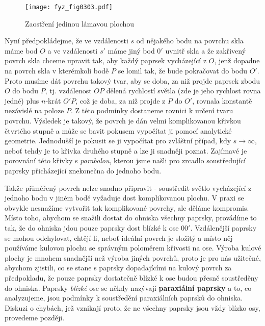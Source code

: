     \begin{figure}[ht!] %
      \centering
      \texttt{[image: fyz\_fig0303.pdf]}
      \caption{Zaostření jedinou lámavou plochou
               \cite[s.~358]{Feynman01}}
      \label{fyz:fig0303}  
    \end{figure}
    
    Nyní předpokládejme, že ve vzdálenosti \(s\) od nějakého bodu na povrchu skla máme bod \(O\) a 
    ve vzdálenosti \(s'\) máme jiný bod \(0'\) uvnitř skla a že zakřivený povrch skla chceme 
    upravit tak, aby každý paprsek vycházející z \(O\), jenž dopadne na povrch skla v kterémkoli 
    bodě \(P\) se lomil tak, že bude pokračovat do bodu \(O'\). Proto musíme dát povrchu takový 
    tvar, aby se doba, za niž projde paprsek zbodu \(O\) do bodu \(P\), tj. vzdálenost \(OP\) 
    dělená rychlostí světla (zde je jeho rychlost rovna jedné) plus \(n\)-krát \(O'P\), což je 
    doba, za niž projde z \(P\) do \(O'\), rovnala konstantě nezávislé na poloze \(P\). Z této 
    podmínky dostaneme rovnici k určení tvaru povrchu. Výsledek je takový, že povrch je dán velmi 
    komplikovanou křivkou čtvrtého stupně a může se bavit pokusem vypočítat ji pomocí analytické 
    geometrie. Jednodušší je pokusit se ji vypočítat pro zvláštní případ, kdy 
    \(s\rightarrow\infty\), neboť tehdy je to křivka druhého stupně a lze ji snadněji poznat. 
    Zajímavé je porovnání této křivky s \emph{parabolou}, kterou jsme našli pro zrcadlo 
    soustředující paprsky přicházející znekonečna do jednoho bodu.
    
    Takže přiměřený povrch nelze snadno připravit - soustředit světlo vycházející z jednoho bodu v 
    jiném bodě vyžaduje dost komplikovanou plochu. V praxi se obvykle nesnažíme vytvořit tak 
    komplikované povrchy, ale děláme kompromis. Místo toho, abychom se snažili dostat do ohniska 
    všechny paprsky, provádíme to tak, že do ohniska jdou pouze paprsky dost blízké k ose \(00'\). 
    Vzdálenější paprsky se mohou odchylovat, chtějí-li, neboť ideální povrch je složitý a místo něj 
    používáme kulovou plochu se správným poloměrem křivosti na ose. Výroba kulové plochy je mnohem 
    snadnější než výroba jiných povrchů, proto je pro nás užitečné, abychom zjistili, co se stane s 
    paprsky dopadajícími na kulový povrch za předpokladu, že pouze paprsky dostatečně blízké k ose 
    budou přesně soustředěny do ohniska. Paprsky \emph{blízké} ose se někdy nazývají 
    \textbf{paraxiální paprsky} a to, co analyzujeme, jsou podmínky k soustředění paraxiálních 
    paprsků do ohniska. Diskuzi o chybách, jež vznikají proto, že ne všechny paprsky jsou vždy 
    blízko osy, provedeme později.
    
